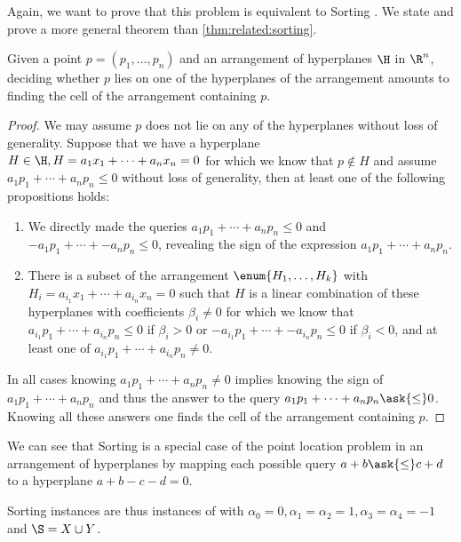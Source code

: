 Again, we want to prove that this problem is equivalent to Sorting \XY. We
state and prove a more general theorem than \ref{thm:related:sorting}.
\begin{theorem}\label{thm:related:sortingxy}
Given a point \(p = (p_1, \ldots, p_n)\) and an arrangement of hyperplanes
\(\H\) in \(\R^n\), deciding whether \(p\) lies on one of the hyperplanes of the
arrangement amounts to finding the cell of the arrangement containing \(p\).
\end{theorem}
\begin{proof}
We may assume \(p\) does not lie on any of the hyperplanes without loss of generality.
Suppose that we have a hyperplane \(H \in \H, H = a_1 x_1 + \cdots + a_n x_n = 0\) for which we
know that \(p \notin H\) and assume \(a_1 p_1 + \cdots + a_n p_n \le 0\)
without loss of generality, then at least one of the following propositions holds:
\begin{enumerate}
\item We directly made the queries \(a_1 p_1 + \cdots + a_n p_n \le 0\) and
\(-a_1 p_1 + \cdots + -a_n p_n \le 0\), revealing the sign of the expression
\(a_1 p_1 + \cdots + a_n p_n\).
\item There is a subset of the arrangement \(\enum{H_1,\ldots,H_k}\) with
\(H_i = a_{i_1} x_1 + \cdots + a_{i_n} x_n = 0\) such that \(H\) is a linear
combination of these hyperplanes with coefficients \(\beta_i \neq 0\) for which we
know that \(a_{i_1} p_1 + \cdots + a_{i_n} p_n \le 0\) if \(\beta_i > 0\) or
\(-a_{i_1} p_1 + \cdots + -a_{i_n} p_n \le 0\) if \(\beta_i < 0\), and at
least one of \(a_{i_1} p_1 + \cdots + a_{i_n} p_n \neq 0\).
\end{enumerate}
In all cases knowing \(a_1 p_1 + \cdots + a_n p_n \neq 0\) implies knowing the
sign of \(a_1 p_1 + \cdots + a_n p_n\) and thus the answer to the query \(a_1
p_1 + \cdots + a_n p_n \ask{\le} 0\). Knowing all these answers one finds the
cell of the arrangement containing \(p\).
\end{proof}

We can see that Sorting \XY is a special case of the point location problem in
an arrangement of hyperplanes by mapping each possible query $a + b \ask{\le} c
+ d$ to a hyperplane $a + b - c - d = 0$.

Sorting \XY instances are thus instances of \fourLDT
with $\alpha_0 = 0, \alpha_1 = \alpha_2 = 1, \alpha_3 = \alpha_4 = -1$ and
$\S = X \cup Y$.
